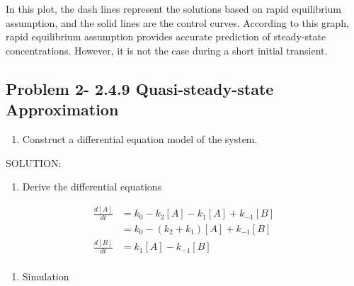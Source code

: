 \documentclass[11pt]{article}
\providecommand{\tightlist}{%
      \setlength{\itemsep}{0pt}\setlength{\parskip}{0pt}}
\begin{document}
    In this plot, the dash lines represent the solutions based on rapid
equilibrium assumption, and the solid lines are the control curves.
According to this graph, rapid equilibrium assumption provides accurate
prediction of steady-state concentrations. However, it is not the case
during a short initial transient.

    \subsection{Problem 2- 2.4.9 Quasi-steady-state
Approximation}\label{problem-2--2.4.9-quasi-steady-state-approximation}

    \begin{enumerate}
\def\labelenumi{(\alph{enumi})}
\tightlist
\item
  Construct a differential equation model of the system.
\end{enumerate}

SOLUTION:

\begin{enumerate}
\def\labelenumi{\arabic{enumi}.}
\tightlist
\item
  Derive the differential equations
\end{enumerate}

\[\begin{align}
\frac{d[A]}{dt} &= k_{0} - k_{2}[A] - k_{1}[A] + k_{-1}[B]\\
                &= k_{0} - (k_{2}+k_{1})[A] + k_{-1}[B]\\
\frac{d[B]}{dt} &= k_{1}[A] - k_{-1}[B] \\
\end{align}\]

\begin{enumerate}
\def\labelenumi{\arabic{enumi}.}
\setcounter{enumi}{1}
\tightlist
\item
  Simulation
\end{enumerate}
\end{document}
